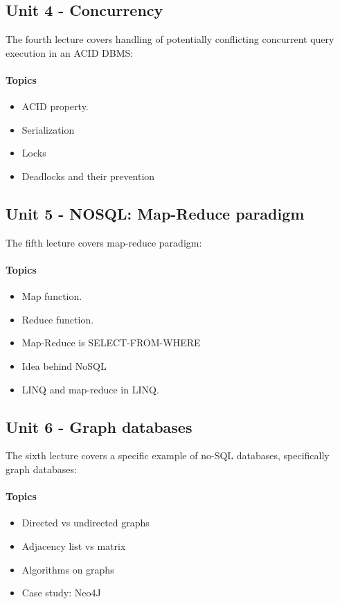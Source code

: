	\subsection{Unit 4 - Concurrency}
		The fourth lecture covers handling of potentially conflicting concurrent query execution in an ACID DBMS:

		\paragraph*{Topics}
			\begin{itemize}
				\item ACID property.
				\item Serialization
				\item Locks
				\item Deadlocks and their prevention
			\end{itemize}


	\subsection{Unit 5 - NOSQL: Map-Reduce paradigm}
		The fifth lecture covers map-reduce paradigm:

		\paragraph*{Topics}
			\begin{itemize}
				\item Map function.
				\item Reduce function.
				\item Map-Reduce is SELECT-FROM-WHERE
				\item Idea behind NoSQL
				\item LINQ and map-reduce in LINQ.
			\end{itemize}


	\subsection{Unit 6 - Graph databases}
		The sixth lecture covers a specific example of no-SQL databases, specifically graph databases:

		\paragraph*{Topics}
			\begin{itemize}
				\item Directed vs undirected graphs
				\item Adjacency list vs matrix
				\item Algorithms on graphs
				\item Case study: Neo4J
			\end{itemize}
